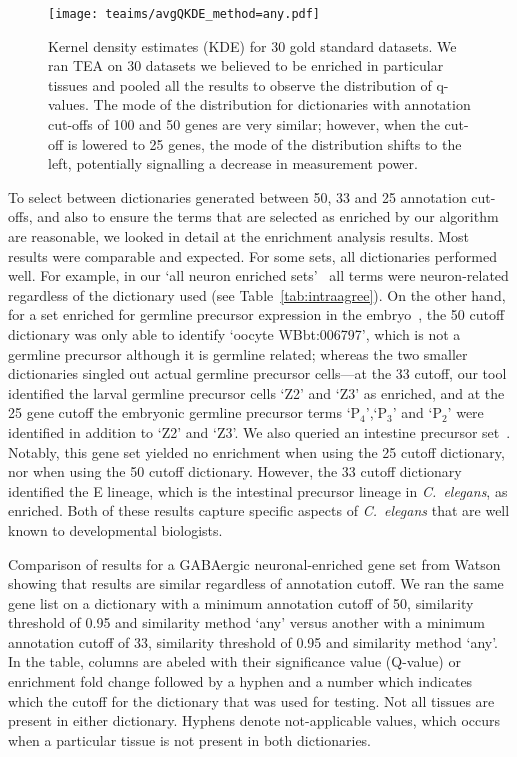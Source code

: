 \begin{figure}[htbp]
	\texttt{[image: teaims/avgQKDE\_method=any.pdf]}
  \caption{
  Kernel density estimates (KDE) for 30 gold standard datasets.
  We ran TEA on 30 datasets we believed to be enriched in particular tissues
  and pooled all the results to observe the distribution of q-values. The
  mode of the distribution for dictionaries with annotation cut-offs of 100
  and 50 genes are very similar; however, when the cut-off is lowered to 25
  genes, the mode of the distribution shifts to the left, potentially
  signalling a decrease in measurement power.}
\label{fig:qvals}
\end{figure}


To select between dictionaries generated between 50, 33 and 25 annotation
cut-offs, and also to ensure the terms that are selected as enriched by our
algorithm are reasonable, we looked in detail at the enrichment analysis results.
Most results were comparable and expected. For some sets, all dictionaries
performed well. For example, in our `all neuron enriched sets'~\citep{Spencer2011,
Watson2008a} all terms were neuron-related regardless of the dictionary used
(see Table~\ref{tab:intraagree}). On the other hand, for a set enriched for
germline precursor expression in the embryo~\citep{Spencer2011}, the 50 cutoff
dictionary was only able to identify `oocyte WBbt:006797', which is not a
germline precursor although it is germline related; whereas the two smaller
dictionaries singled out actual germline precursor cells---at the 33 cutoff, our
tool identified the larval germline precursor cells `Z2' and `Z3' as enriched,
and at the 25 gene cutoff the embryonic germline precursor terms `P$_4$',`P$_3$'
and `P$_2$' were identified in addition to `Z2' and `Z3'.
We also queried an intestine precursor set~\citep{Spencer2011}. Notably, this
gene set yielded no enrichment when using the 25 cutoff dictionary, nor when
using the 50 cutoff dictionary. However, the 33 cutoff dictionary identified the
E lineage, which is the intestinal precursor lineage in \emph{C.~elegans}, as
enriched. Both of these results capture specific aspects of \emph{C.~elegans}
that are well known to developmental biologists.

\begin{table}[p]
	\caption{
	Comparison of results for a GABAergic neuronal-enriched gene set from
  Watson~\citep{Watson2008a} showing that results are similar regardless of
  annotation cutoff. We ran the same gene list on a dictionary with a minimum
  annotation cutoff of 50, similarity threshold of 0.95 and similarity method
  `any' versus another with a minimum annotation cutoff of 33, similarity
  threshold of 0.95 and similarity method `any'. In the table, columns are
  abeled with their significance value (Q-value) or enrichment fold change
  followed by a hyphen and a number which indicates which the cutoff for the
  dictionary that was used for testing. Not all tissues are present in either
  dictionary. Hyphens denote not-applicable values, which occurs when a
  particular tissue is not present in both dictionaries.
	}
\label{tab:intraagree}
\end{table}

